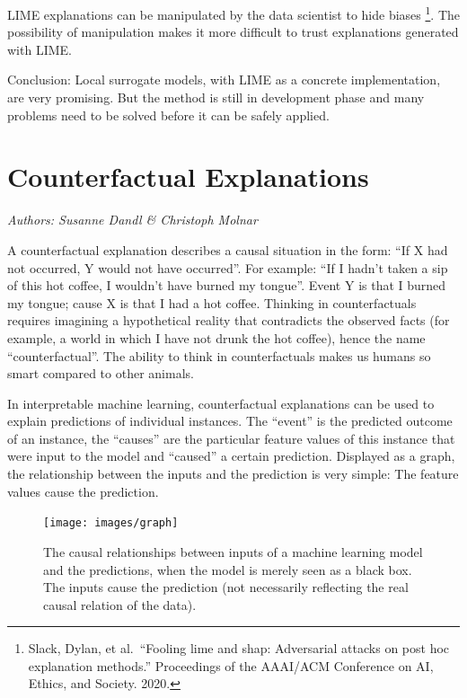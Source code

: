 \documentclass[
  12pt,
]{krantz}
\begin{document}
LIME explanations can be manipulated by the data scientist to hide biases \footnote{Slack, Dylan, et al.~``Fooling lime and shap: Adversarial attacks on post hoc explanation methods.'' Proceedings of the AAAI/ACM Conference on AI, Ethics, and Society. 2020.}.
The possibility of manipulation makes it more difficult to trust explanations generated with LIME.

Conclusion:
Local surrogate models, with LIME as a concrete implementation, are very promising.
But the method is still in development phase and many problems need to be solved before it can be safely applied.

\newpage

\hypertarget{counterfactual}{%
\section{Counterfactual Explanations}\label{counterfactual}}

\emph{Authors: Susanne Dandl \& Christoph Molnar}

A counterfactual explanation describes a causal situation in the form: ``If X had not occurred, Y would not have occurred''.
For example: ``If I hadn't taken a sip of this hot coffee, I wouldn't have burned my tongue''.
Event Y is that I burned my tongue;
cause X is that I had a hot coffee.
Thinking in counterfactuals requires imagining a hypothetical reality that contradicts the observed facts (for example, a world in which I have not drunk the hot coffee), hence the name ``counterfactual''.
The ability to think in counterfactuals makes us humans so smart compared to other animals.

In interpretable machine learning, counterfactual explanations can be used to explain predictions of individual instances.
The ``event'' is the predicted outcome of an instance, the ``causes'' are the particular feature values of this instance that were input to the model and ``caused'' a certain prediction.
Displayed as a graph, the relationship between the inputs and the prediction is very simple:
The feature values cause the prediction.

\begin{figure}

{\centering \texttt{[image: images/graph]} 

}

\caption{The causal relationships between inputs of a machine learning model and the predictions, when the model is merely seen as a black box. The inputs cause the prediction (not necessarily reflecting the real causal relation of the data).}\label{fig:ml-graph-cf}
\end{figure}
\end{document}
